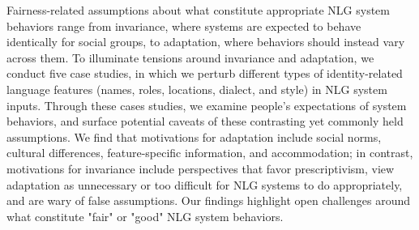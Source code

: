 Fairness-related assumptions about what constitute appropriate NLG system behaviors range from invariance, where systems are expected to behave identically for social groups, to adaptation, where behaviors should instead vary across them. To illuminate tensions around invariance and adaptation, we conduct five case studies, in which we perturb different types of identity-related language features (names, roles, locations, dialect, and style) in NLG system inputs. Through these cases studies, we examine people's expectations of system behaviors, and surface potential caveats of these contrasting yet commonly held assumptions. We find that motivations for adaptation include social norms, cultural differences, feature-specific information, and accommodation; in contrast, motivations for invariance include perspectives that favor prescriptivism, view adaptation as unnecessary or too difficult for NLG systems to do appropriately, and are wary of false assumptions. Our findings highlight open challenges around what constitute "fair" or "good" NLG system behaviors.